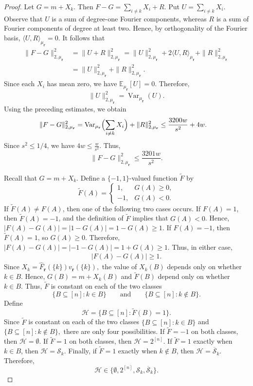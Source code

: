 \documentclass[11pt]{article}
\numberwithin{equation}{section}
\theoremstyle{definition}
\theoremstyle{remark}
\begin{document}
\begin{proof}
Let
$
G=m+X_k.
$
Then
$
F-G=\sum_{i\neq k}X_i+R.
$
Put
$
U=\sum_{i\neq k}X_i.
$
Observe that $U$ is a sum of degree-one Fourier components, whereas
$R$ is a sum of Fourier components of degree at least two. Hence,
by orthogonality of the Fourier basis,
$
\langle U,R\rangle_{\mu_{\mathbf r}}=0.
$
It follows that
$$
\begin{aligned}
\|F-G\|_{2,\mu_{\mathbf r}}^2
&=\|U+R\|_{2,\mu_{\mathbf r}}^2=\|U\|_{2,\mu_{\mathbf r}}^2
+2\langle U,R\rangle_{\mu_{\mathbf r}}
+\|R\|_{2,\mu_{\mathbf r}}^2\\
&=\|U\|_{2,\mu_{\mathbf r}}^2
+\|R\|_{2,\mu_{\mathbf r}}^2.
\end{aligned}
$$
Since each $X_i$ has mean zero, we have
$
\mathbb E_{\mu_{\mathbf r}}[U]=0.
$
Therefore,
$$
\|U\|_{2,\mu_{\mathbf r}}^2
=
\operatorname{Var}_{\mu_{\mathbf r}}(U).
$$
Using the preceding estimates, we obtain
$$
\begin{aligned}
\|F-G\|_{2,\mu_{\mathbf r}}^2
&=
\operatorname{Var}_{\mu_{\mathbf r}}
\Bigl(\sum_{i\neq k}X_i\Bigr)
+\|R\|_{2,\mu_{\mathbf r}}^2\leq
\frac{3200w}{s^2}+4w.
\end{aligned}
$$
Since $s^2\leq1/4$, we have
$
4w\leq\frac{w}{s^2}.
$
Thus,
$$
\|F-G\|_{2,\mu_{\mathbf r}}^2
\leq
\frac{3201w}{s^2}.
$$

Recall that $
G=m+X_k.$
Define a $\{-1,1\}$-valued function $\widetilde F$ by
$$
\widetilde F(A)=
\begin{cases}
1,&G(A)\geq0,\\
-1,&G(A)<0.
\end{cases}
$$
If $\widetilde F(A)\neq F(A)$, then one of the following two cases
occurs. If $F(A)=1$, then $\widetilde F(A)=-1$, and the definition of
$\widetilde F$ implies that $G(A)<0$. Hence,
$
|F(A)-G(A)|
=
|1-G(A)|
=
1-G(A)
\geq1.
$
If $F(A)=-1$, then $\widetilde F(A)=1$, so $G(A)\geq0$. Therefore,
$
|F(A)-G(A)|
=
|-1-G(A)|
=
1+G(A)
\geq1.
$
Thus, in either case,
\begin{align}
|F(A)-G(A)|\geq1.\label{f34}
\end{align}
Since
$
X_k
=
\widehat F_{\mathbf r}(\{k\})
v_{\mathbf r}(\{k\}),
$
the value of $X_k(B)$ depends only on whether $k\in B$. Hence,
$G(B)=m+X_k(B)$ and  $\widetilde F(B)$ depend only
on whether $k\in B$.
Thus, $\widetilde F$ is constant on each of the two classes
$$
\{B\subseteq[n]:k\in B\}
\qquad\text{and}\qquad
\{B\subseteq[n]:k\notin B\}.
$$
Define
$$
\mathcal H
=
\{B\subseteq[n]:\widetilde F(B)=1\}.
$$
Since $\widetilde F$ is constant on each of the two classes
$
\{B\subseteq[n]:k\in B\}
$
and
$
\{B\subseteq[n]:k\notin B\},
$
there are only four possibilities. If $\widetilde F=-1$ on both
classes, then $\mathcal H=\emptyset$. If $\widetilde F=1$ on both
classes, then $\mathcal H=2^{[n]}$. If $\widetilde F=1$ exactly when
$k\in B$, then $\mathcal H=\mathcal S_k$. Finally, if
$\widetilde F=1$ exactly when $k\notin B$, then
$\mathcal H=\overline{\mathcal S}_k$. Therefore,
$$
\mathcal H\in
\{\emptyset,2^{[n]},
\mathcal S_k,\overline{\mathcal S}_k\}.
$$



\end{proof}
\end{document}
